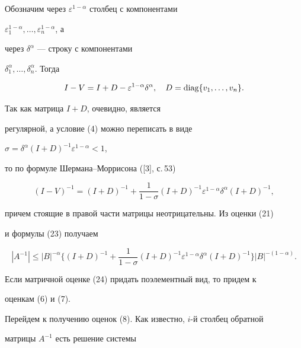 \begin{pf}
Обозначим через $\varepsilon^{1-\alpha}$ столбец с компонентами 


$\varepsilon^{1-\alpha}_1,\dotsc,\varepsilon^{1-\alpha}_n$, а 


через $\delta^\alpha$ --- строку с компонентами 


$\delta^\alpha_1,\dotsc,\delta^\alpha_n$. Тогда 


\begin{equation} 


I-V=I+D-\varepsilon^{1-\alpha}\delta^\alpha,\quad 


D=\diag\{v_1,\dotsc,v_n\}. 


\end{equation} 


Так как матрица $I+D$, очевидно, является 


регулярной, а условие (4) можно переписать в виде 


$\sigma=\delta^\alpha(I+D)^{-1}\varepsilon^{1-\alpha}<1$, 


то по формуле Шермана--Моррисона ([3], с.\,53) 


\begin{equation} 


(I-V)^{-1}=(I+D)^{-1}+\frac{1}{1-\sigma}(I+D)^{-1} 


\varepsilon^{1-\alpha}\delta^\alpha(I+D)^{-1}, 


\end{equation} 


причем стоящие в правой части матрицы неотрицательны. Из оценки (21) 


и формулы (23) получаем 


\begin{equation} 


|A^{-1}|\le|B|^{-\alpha}\bigg\{(I+D)^{-1}+\frac{1}{1-\sigma} 


(I+D)^{-1}\varepsilon^{1-\alpha}\delta^\alpha(I+D)^{-1}\bigg\} 


|B|^{-(1-\alpha)}. 


\end{equation} 


Если матричной оценке (24) придать поэлементный вид, то придем к 


оценкам (6) и (7). 


 


Перейдем к получению оценок (8). Как известно, $i$-й столбец обратной 


матрицы $A^{-1}$ есть решение системы 



\end{pf}
